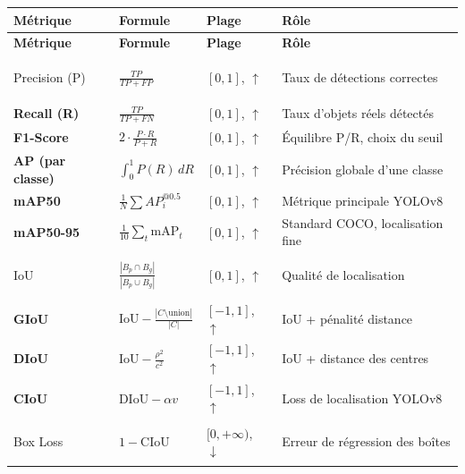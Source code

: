 \documentclass[12pt, a4paper]{report}
\newcommand{\mAP}{\text{mAP}}
\newcommand{\IoU}{\text{IoU}}
\begin{document}
\begin{longtable}{>{\bfseries}p{3.2cm} p{3.8cm} p{3.5cm} p{3.5cm}}
  \toprule
  \textbf{Métrique} & \textbf{Formule} & \textbf{Plage} & \textbf{Rôle} \\
  \midrule
  \endfirsthead
  \toprule
  \textbf{Métrique} & \textbf{Formule} & \textbf{Plage} & \textbf{Rôle} \\
  \midrule
  \endhead
  \bottomrule
  \endlastfoot

  Precision (P)
    & $\frac{TP}{TP+FP}$
    & $[0, 1]$, $\uparrow$
    & Taux de détections correctes \\[4pt]

  Recall (R)
    & $\frac{TP}{TP+FN}$
    & $[0, 1]$, $\uparrow$
    & Taux d'objets réels détectés \\[4pt]

  F1-Score
    & $2 \cdot \frac{P \cdot R}{P+R}$
    & $[0, 1]$, $\uparrow$
    & Équilibre P/R, choix du seuil \\[4pt]

  AP (par classe)
    & $\int_0^1 P(R)\,dR$
    & $[0, 1]$, $\uparrow$
    & Précision globale d'une classe \\[4pt]

  mAP50
    & $\frac{1}{N}\sum AP_i^{@0.5}$
    & $[0, 1]$, $\uparrow$
    & Métrique principale YOLOv8 \\[4pt]

  mAP50-95
    & $\frac{1}{10}\sum_{t} \mAP_t$
    & $[0, 1]$, $\uparrow$
    & Standard COCO, localisation fine \\[4pt]

  \midrule

  IoU
    & $\frac{|B_p \cap B_g|}{|B_p \cup B_g|}$
    & $[0, 1]$, $\uparrow$
    & Qualité de localisation \\[4pt]

  GIoU
    & $\IoU - \frac{|C \setminus \text{union}|}{|C|}$
    & $[-1, 1]$, $\uparrow$
    & IoU + pénalité distance \\[4pt]

  DIoU
    & $\IoU - \frac{\rho^2}{c^2}$
    & $[-1, 1]$, $\uparrow$
    & IoU + distance des centres \\[4pt]

  CIoU
    & $\text{DIoU} - \alpha v$
    & $[-1, 1]$, $\uparrow$
    & Loss de localisation YOLOv8 \\[4pt]

  \midrule

  Box Loss
    & $1 - \text{CIoU}$
    & $[0, +\infty)$, $\downarrow$
    & Erreur de régression des boîtes \\[4pt]


\end{longtable}
\end{document}
